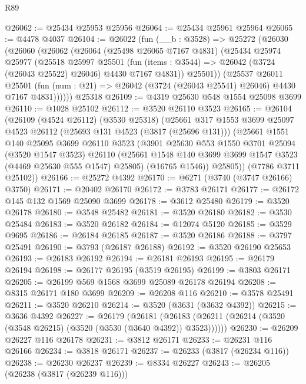 \begin{lexlean}{R89}
\begin{coremodule}
@26062 := @25434 @25953 @25956
@26064 := @25434 @25961 @25964
@26065 := @4478 @4037
@26104 := @26022
    (fun (__b : @3528) =>
    @25272
      (@26030
        (@26060
          (@26062
            (@26064
              (@25498 @26065 @7167 @4831)
              (@25434
                @25974
                @25977
                (@25518
                  @25997
                  @25501
                  (fun (items : @3544) => @26042 (@3724 (@26043 @25522) @26046) @4430 @7167 @4831))
                @25501))
            (@25537
              @26011
              @25501
              (fun (num : @21) => @26042 (@3724 (@26043 @25541) @26046) @4430 @7167 @4831))))))
    @25318
@26109 := @4319 @25630 @548 @1554 @25098 @3699
@26110 := @1028 @25102
@26112 := @3520 @26110 @3523
@26165 := @26104
    (@26109
      (@4524 @26112)
      (@3530 @25318)
      (@25661
        @317
        @1553
        @3699
        @25097
        @4523
        @26112
        (@25693 @131 @4523 (@3817 (@25696 @131)))
        (@25661
          @1551
          @140
          @25095
          @3699
          @26110
          @3523
          (@3901
            @25630
            @553
            @1550
            @3701
            @25094
            (@3520 @1547 @3523)
            @26110
            (@25661 @1548 @140 @3699 @3699 @1547 @3523 (@4469 @25630 @555 @1547) @25805)
            (@16765 @1546))
          @25805))
      (@7786 @3711 @25102))
@26166 := @25272 @4392
@26170 := @6271 (@3740 (@3747 @26166) @3750)
@26171 := @20402 @26170
@26172 := @3783 @26171
@26177 := @26172 @145 @132 @1569 @25090 @3699
@26178 := @3612 @25480
@26179 := @3520 @26178
@26180 := @3548 @25482
@26181 := @3520 @26180
@26182 := @3530 @25484
@26183 := @3520 @26182
@26184 := @12074 @5120
@26185 := @3529 @9695
@26186 := @26184 @26185
@26187 := @3520 @26186
@26188 := @3797 @25491
@26190 := @3793 (@26187 @26188)
@26192 := @3520 @26190 @25653
@26193 := @26183 @26192
@26194 := @26181 @26193
@26195 := @26179 @26194
@26198 := @26177 @26195 (@3519 @26195)
@26199 := @3803 @26171
@26205 := @26199 @569 @1568 @3699 @25089 @26178 @26194
@26208 := @8315 @26171 @180 @3699
@26209 := @26208 @116
@26210 := @3578 @25491
@26211 := @3520 @26210
@26214 := @3520 (@3631 (@3632 @4392))
@26215 := @3636 @4392
@26227 := @26179
    (@26181 (@26183 (@26211 (@26214 (@3520 (@3548 @26215) (@3520 (@3530 (@3640 @4392)) @3523))))))
@26230 := @26209 @26227 @116 @26178
@26231 := @3812 @26171
@26233 := @26231 @116 @26166
@26234 := @3818 @26171
@26237 := @26233 (@3817 (@26234 @116))
@26238 := @26230 @26237
@26239 := @8334 @26227
@26243 := @26205 (@26238 (@3817 (@26239 @116)))

\end{coremodule}
\end{lexlean}
